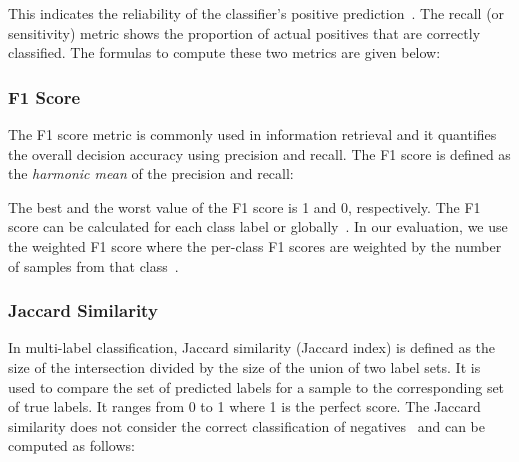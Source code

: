 This indicates the reliability of the classifier's positive prediction~\cite{deep-learning-metrics}. 
The recall (or sensitivity) metric shows the proportion of actual positives that are correctly classified.  
The formulas to compute these two metrics are given below:


\vspace{0.1em}
\subsubsection{F1 Score}
The F1 score metric is commonly used in information retrieval and it quantifies the overall decision accuracy using precision and recall.  
The F1 score is defined as the \textit{harmonic mean} of the precision and recall:

The best and the worst value of the F1 score is 1 and 0, respectively. The F1 score can be calculated for each class label or globally~\cite{sklearn}. In our evaluation, we use the weighted F1 score where the per-class F1 scores are weighted by the number of samples from that class~\cite{metric_web}.
 
\subsubsection{Jaccard Similarity} In multi-label classification, Jaccard similarity (Jaccard index) is defined as the size of the intersection divided by the size of the union of two label sets. It is used to compare the set of predicted labels for a sample to the corresponding set of true labels. It ranges from 0 to 1 where 1 is the perfect score. The Jaccard similarity does not consider the correct classification of negatives~\cite{deep-learning-metrics} and can be computed as follows: \\

